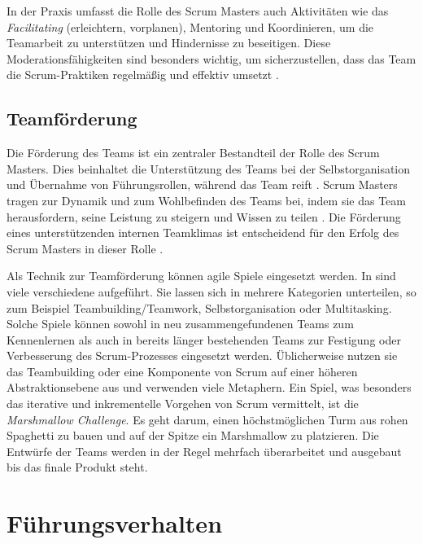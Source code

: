 \documentclass[5pt, final]{beamer}
\begin{document}
\begin{frame}[t]
\begin{multicols}{3}
			In der Praxis umfasst die Rolle des Scrum Masters auch Aktivitäten wie das \textit{Facilitating} (erleichtern, vorplanen), Mentoring und Koordinieren, um die Teamarbeit zu unterstützen und Hindernisse zu beseitigen.
            Diese Moderationsfähigkeiten sind besonders wichtig, um sicherzustellen, dass das Team die Scrum-Praktiken regelmäßig und effektiv umsetzt \cite{Shastri21}.
			
			\subsection{Teamförderung}
			
			Die Förderung des Teams ist ein zentraler Bestandteil der Rolle des Scrum Masters.
            Dies beinhaltet die Unterstützung des Teams bei der Selbstorganisation und Übernahme von Führungsrollen, während das Team reift \cite{?}.
            Scrum Masters tragen zur Dynamik und zum Wohlbefinden des Teams bei, indem sie das Team herausfordern, seine Leistung zu steigern und Wissen zu teilen \cite{?}.
            Die Förderung eines unterstützenden internen Teamklimas ist entscheidend für den Erfolg des Scrum Masters in dieser Rolle \cite{?}.
            
            Als Technik zur Teamförderung können agile Spiele eingesetzt werden.
            In \cite{bless24} sind viele verschiedene aufgeführt.
            Sie lassen sich in mehrere Kategorien unterteilen, so zum Beispiel Teambuilding/Teamwork, Selbstorganisation oder Multitasking.
            Solche Spiele können sowohl in neu zusammengefundenen Teams zum Kennenlernen als auch in bereits länger bestehenden Teams zur Festigung oder Verbesserung des Scrum-Prozesses eingesetzt werden.
            Üblicherweise nutzen sie das Teambuilding oder eine Komponente von Scrum auf einer höheren Abstraktionsebene aus und verwenden viele Metaphern.
            Ein Spiel, was besonders das iterative und inkrementelle Vorgehen von Scrum vermittelt, ist die \textit{Marshmallow Challenge}.
            Es geht darum, einen höchstmöglichen Turm aus rohen Spaghetti zu bauen und auf der Spitze ein Marshmallow zu platzieren.
            Die Entwürfe der Teams werden in der Regel mehrfach überarbeitet und ausgebaut bis das finale Produkt steht.
			
			\section {Führungsverhalten}
            

\end{multicols}
\end{frame}
\end{document}

